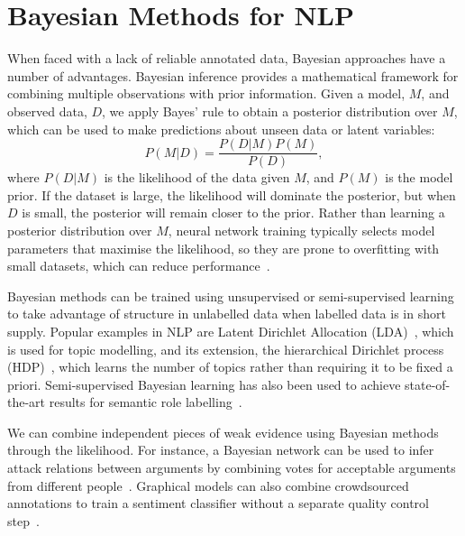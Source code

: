 \section{Bayesian Methods for NLP}\label{sec:bayesian}

When faced with a lack of reliable annotated data, 
Bayesian approaches have a number of advantages.
Bayesian inference provides a mathematical framework for combining multiple observations
with prior information. 
Given a model, $M$, and observed data, $D$, we apply Bayes' rule
to obtain a posterior distribution over $M$, which can be used to make predictions 
about unseen data or latent variables:
\begin{equation}
  P(M|D) = \frac{P(D|M)P(M)}{P(D)},
  \label{eq:bayesrule}
\end{equation}
where $P(D|M)$ is the likelihood of the data given $M$, and $P(M)$ is the model prior.
If the dataset is large, the likelihood will dominate the posterior,
but when $D$ is small, the posterior will remain closer to the prior.
Rather than learning a posterior distribution over $M$,
neural network training typically selects model parameters that maximise the likelihood, 
so they are prone to overfitting with small datasets, which can reduce performance~\cite{xiong2011bayesian}.

Bayesian methods can be trained using unsupervised or semi-supervised learning
to take advantage of structure in unlabelled data when labelled data is in short supply.
Popular examples in NLP are
Latent Dirichlet Allocation (LDA)~\cite{blei2003latent}, which is used for topic modelling,
and its extension, the hierarchical Dirichlet process (HDP)~\cite{teh2005sharing}, which learns the number of topics rather than requiring it to be fixed a priori.
Semi-supervised Bayesian learning
has also been used to achieve state-of-the-art results for semantic role labelling~\cite{titov2012bayesian}.

We can combine independent pieces of weak evidence using Bayesian methods through the likelihood.
For instance, a Bayesian network can be used to infer attack relations between arguments by combining votes for acceptable arguments from different people~\cite{kido2017}.
Graphical models can also combine crowdsourced annotations to train a sentiment classifier
without a separate quality control step~\cite{simpson2015language,felt2016semantic}.

